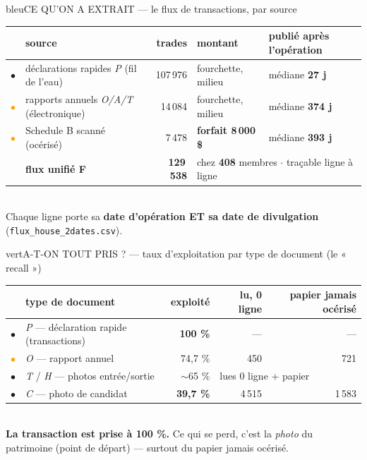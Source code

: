\documentclass[10pt,a4paper]{article}
\newcommand{\feu}[1]{\textcolor{#1}{\Large$\bullet$}}
\newcommand{\fv}{\feu{vert}}\newcommand{\fo}{\feu{orange}}\newcommand{\fr}{\feu{rouge}}
\begin{document}
\begin{bloc}{bleu}{CE QU'ON A EXTRAIT --- le flux de transactions, par source}
\footnotesize
\begin{tabular}{@{}c l r l l@{}}
 & \textbf{source} & \textbf{trades} & \textbf{montant} & \textbf{publié après l'opération}\\
\midrule
\fv & déclarations rapides \emph{P} (fil de l'eau) & 107\,976 & fourchette, milieu & médiane \textbf{27 j}\\
\fo & rapports annuels \emph{O/A/T} (électronique) & 14\,084 & fourchette, milieu & médiane \textbf{374 j}\\
\fo & Schedule B scanné (océrisé) & 7\,478 & \textbf{forfait 8\,000\,\$} & médiane \textbf{393 j}\\
\midrule
 & \textbf{flux unifié F} & \textbf{129\,538} & \multicolumn{2}{l}{chez \textbf{408} membres $\cdot$ traçable ligne à ligne}\\
\end{tabular}\\[1mm]
{\scriptsize\color{grisf} Chaque ligne porte sa \textbf{date d'opération ET sa date de divulgation}
(\texttt{flux\_house\_2dates.csv}).}
\end{bloc}

\begin{bloc}{vert}{A-T-ON TOUT PRIS ? --- taux d'exploitation par type de document (le « recall »)}
\footnotesize
\begin{tabular}{@{}c l r r r@{}}
 & \textbf{type de document} & \textbf{exploité} & \textbf{lu, 0 ligne} & \textbf{papier jamais océrisé}\\
\midrule
\fv & \emph{P} --- déclaration rapide (transactions) & \textbf{100 \%} & --- & ---\\
\fo & \emph{O} --- rapport annuel & 74,7 \% & 450 & 721\\
\fr & \emph{T} / \emph{H} --- photos entrée/sortie & $\sim$65 \% & \multicolumn{2}{l}{lues 0 ligne + papier}\\
\fr & \emph{C} --- photo de candidat & \textbf{39,7 \%} & 4\,515 & 1\,583\\
\end{tabular}\\[1mm]
{\scriptsize\color{grisf} \textbf{La transaction est prise à 100 \%.} Ce qui se perd, c'est la \emph{photo}
du patrimoine (point de départ) --- surtout du papier jamais océrisé.}
\end{bloc}
\end{document}
